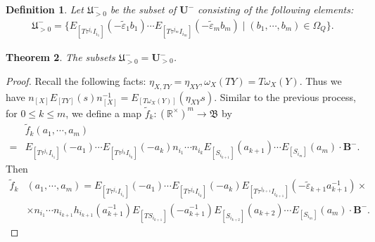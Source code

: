 \documentclass[12pt]{amsart}
\newtheorem{theorem}{Theorem}[section]
\newtheorem{definition}[theorem]{Definition}
\begin{document}
\begin{definition}
    Let $\mathfrak{U}^-_{>0}$ be the subset of $\mathbf{U}^-$ consisting of the following elements:
    \begin{align*}
        \mathfrak{U}^-_{>0}=\{ E_{[T\tau^{j_1}I_{i_1}]}(-\tilde{\varepsilon}_1b_1)\cdots  E_{[T\tau^{j_m}I_{i_m}]}(-\tilde{\varepsilon}_mb_m) \mid (b_1,\cdots,b_m)\in \Omega_Q \}.
    \end{align*}
\end{definition}

\begin{theorem}
    The subsets $\mathfrak{U}^-_{>0}=\mathbf{U}^-_{>0}$.
\end{theorem}

\begin{proof}
    Recall the following facts: $\eta_{X,TY}=\eta_{XY}, \omega_X(TY)=T\omega_X(Y)$.
    Thus we have $n_{[X]}E_{[TY]}(s)n_{[X]}^{-1}=E_{[T\omega_X(Y)]}(\eta_{XY}s)$.    
    Similar to the previous process, for $0\leq k\leq m$, we define a map $\tilde{f}_k:(\mathbb{R}^{\times})^m\rightarrow \mathfrak{B}$ by 
    \begin{align*}
        &\tilde{f}_k(a_1,\cdots,a_m)\\
        =& E_{[T\tau^{j_1}I_{i_1}]}(-a_1)\cdots E_{[T\tau^{j_k}I_{i_k}]}(-a_k)n_{i_1}\cdots n_{i_k} E_{[S_{i_{k+1}}]}(a_{k+1})\cdots E_{[S_{i_m}]}(a_m)\cdot \mathbf{B}^-.
    \end{align*}
    Then 
    \begin{align*}
         \tilde{f}_k&(a_1,\cdots,a_m)= E_{[T\tau^{j_1}I_{i_1}]}(-a_1)\cdots E_{[T\tau^{j_k}I_{i_k}]}(-a_k) E_{[T\tau^{j_{k+1}}I_{i_{k+1}}]}(-\tilde{\varepsilon}_{k+1}a_{k+1}^{-1})\times \\
        & \times  n_{i_1}\cdots n_{i_{k+1}} h_{i_{k+1}}(a_{k+1}^{-1}) E_{[TS_{i_{k+1}}]}(-a_{k+1}^{-1}) E_{[S_{i_{k+2}}]}(a_{k+2}) \cdots E_{[S_{i_m}]}(a_m)\cdot \mathbf{B}^-.
    \end{align*}
    

\end{proof}
\end{document}
